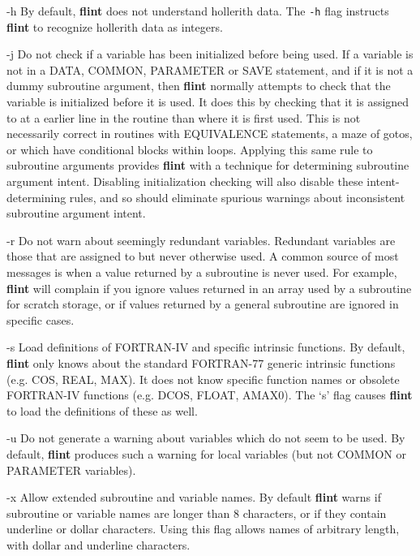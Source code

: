 \item{-h} By default, {\bf flint} does not understand hollerith data. The
{\tt -h} flag instructs {\bf flint} to recognize hollerith data as integers.

\item{-j} Do not check if a variable has been initialized before being used.
If a variable is not in a DATA, COMMON, PARAMETER or SAVE statement,
and if it is not a dummy subroutine argument, then {\bf flint} normally
attempts to check that the variable is initialized before it is used. It
does this by checking that it is assigned to at a earlier line in the
routine than where it is first used. This is not necessarily correct in
routines with EQUIVALENCE statements, a maze of gotos, or which have
conditional blocks within loops.  Applying this same rule to subroutine
arguments provides {\bf flint} with a technique for determining subroutine
argument intent.  Disabling initialization checking will also disable these
intent-determining rules, and so should eliminate spurious warnings about
inconsistent subroutine argument intent.

\item{-r} Do not warn about seemingly redundant variables. Redundant variables
are those that are assigned to but never otherwise used. A common
source of most messages is when a value returned by a subroutine
is never used.  For example, {\bf flint} will complain if you ignore values
returned in an array used by a subroutine for scratch storage, or if values
returned by a general subroutine are ignored in specific cases.

\item{-s} Load definitions of FORTRAN-IV and specific intrinsic functions.
By default, {\bf flint} only knows about the standard FORTRAN-77 generic
intrinsic functions (e.g. COS, REAL, MAX). It does not know specific
function names or obsolete FORTRAN-IV functions (e.g. DCOS, FLOAT, AMAX0).
The `s' flag causes {\bf flint} to load the definitions of these as well.

\item{-u} Do not generate a warning about variables which do not seem to be
used. By default, {\bf flint} produces such a warning for local variables
(but not COMMON or PARAMETER variables).

\item{-x} Allow extended subroutine and variable names. By default {\bf flint}
warns if subroutine or variable names are longer than 8 characters, or if
they contain underline or dollar characters. Using this flag allows names
of arbitrary length, with dollar and underline characters.

